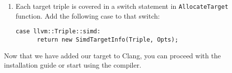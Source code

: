 \begin{enumerate}
\item Each target triple is covered in a switch statement in \texttt{AllocateTarget} function. Add the following case to that switch:
\begin{lstlisting}
case llvm::Triple::simd:
      return new SimdTargetInfo(Triple, Opts);
\end{lstlisting}
\end{enumerate}

Now that we have added our target to Clang, you can proceed with the installation guide or start using the compiler.